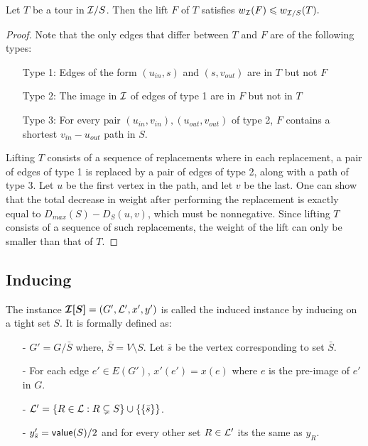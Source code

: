 \documentclass[./main.tex]{subfiles}
\begin{document}
	\begin{lemma}\label{lemm:3:lift-c}
		Let $T$ be a tour in $\mathcal{I}/S$. Then the lift $F$ of $T$ satisfies $w_{\mathcal{I}}(F) \leqslant w_{\mathcal{I}/S}(T).$
	\end{lemma}
	\begin{proof}
	Note that the only edges that differ between $T$ and $F$ are of the following types:
	\begin{itemize}
		\item[Type 1:] Edges of the form $(u_{in},s)$ and $(s,v_{out})$ are in $T$ but not $F$
		\item[Type 2:] The image in $\mathcal{I}$ of edges of type 1 are in $F$ but not in $T$
		\item[Type 3:] For every pair $(u_{in}, v_{in}),(u_{out},v_{out})$ of type 2, $F$ contains a shortest $v_{in}-u_{out}$ path in $S$.
	\end{itemize}
Lifting $T$ consists of a sequence of replacements where in each replacement, a pair of edges of type 1 is replaced by a pair of edges of type 2, along with a path of type 3. Let $u$ be the first vertex in the path, and let $v$ be the last. One can show that the total decrease in weight after performing the replacement is exactly equal to $D_{max}(S) - D_S(u,v) $, which must be nonnegative. Since lifting $T$ consists of a sequence of such replacements, the weight of the lift can only be smaller than that of $T$.
	\end{proof}

	\subsection{Inducing}
	\begin{definition}
		The instance $\bm{\mathcal{I}[S]} = (G', \mathcal{L}', x', y')$ is called the induced instance by inducing on a tight set $S$. It is formally defined as:
		\begin{itemize}
			\item[-] $G' = G/\bar{S}$ where, $\bar{S} = V\setminus S$. Let $\bar{s}$ be the vertex corresponding to set $\bar{S}$.
			\item[-] For each edge $e' \in E(G')$, $x'(e') = x(e)$ where $e$ is the pre-image of $e'$ in $G$.
			\item[-] $\mathcal{L}' = \{R \in \mathcal{L} : R \subsetneq S\} \cup \{\{\bar{s}\}\}$.
			\item[-] $y'_{\bar{s}} = \textsf{\textup{value}}(S)/2$ and for every other set $R \in \mathcal{L}'$ its the same as $y_R$.\\
		\end{itemize}
	\end{definition}\vspace{2mm}
\end{document}
